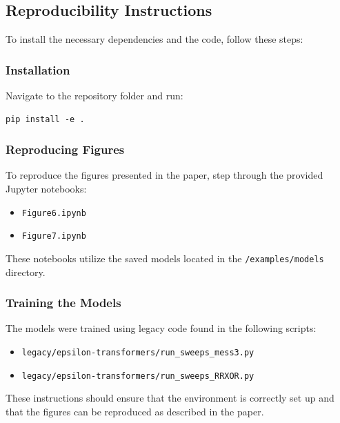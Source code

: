 \documentclass{article}
\begin{document}
\subsection{Reproducibility Instructions}

To install the necessary dependencies and the code, follow these steps:

\subsubsection{Installation}

Navigate to the repository folder and run:
\begin{verbatim}
pip install -e .
\end{verbatim}

\subsubsection{Reproducing Figures}

To reproduce the figures presented in the paper, step through the provided Jupyter notebooks:

\begin{itemize}
    \item \texttt{Figure6.ipynb}
    \item \texttt{Figure7.ipynb}
\end{itemize}

These notebooks utilize the saved models located in the \texttt{/examples/models} directory.

\subsubsection{Training the Models}

The models were trained using legacy code found in the following scripts:

\begin{itemize}
    \item \texttt{legacy/epsilon-transformers/run\_sweeps\_mess3.py}
    \item \texttt{legacy/epsilon-transformers/run\_sweeps\_RRXOR.py}
\end{itemize}

These instructions should ensure that the environment is correctly set up and that the figures can be reproduced as described in the paper.
\end{document}
